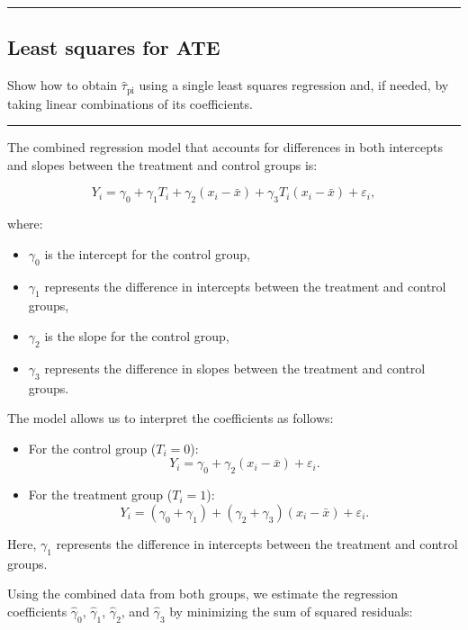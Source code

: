 \documentclass{article}
\newenvironment{colorparagraph}[1]{\par\color{#1}}{\par}
\begin{document}
\begin{colorparagraph}{questioncolor}
\rule{\textwidth}{0.5pt}

\label{q2i}\subsection{Least squares for ATE}
Show how to obtain \(\hat{\tau}_{\text{pi}}\) using a single least squares regression and, if needed, by taking linear combinations of its coefficients.

\rule{\textwidth}{0.5pt}
\end{colorparagraph}

The combined regression model that accounts for differences in both intercepts and slopes between the treatment and control groups is:

\[
Y_i = \gamma_0 + \gamma_1 T_i + \gamma_2 (x_i - \bar{x}) + \gamma_3 T_i (x_i - \bar{x}) + \varepsilon_i,
\]

where:
\begin{itemize}
    \item \(\gamma_0\) is the intercept for the control group,
    \item \(\gamma_1\) represents the difference in intercepts between the treatment and control groups,
    \item \(\gamma_2\) is the slope for the control group,
    \item \(\gamma_3\) represents the difference in slopes between the treatment and control groups.
\end{itemize}

The model allows us to interpret the coefficients as follows:

\begin{itemize}
    \item For the control group (\(T_i = 0\)): 
    \[
    Y_i = \gamma_0 + \gamma_2 (x_i - \bar{x}) + \varepsilon_i.
    \]
    \item For the treatment group (\(T_i = 1\)): 
    \[
    Y_i = (\gamma_0 + \gamma_1) + (\gamma_2 + \gamma_3)(x_i - \bar{x}) + \varepsilon_i.
    \]
\end{itemize}

Here, \(\gamma_1\) represents the difference in intercepts between the treatment and control groups.

Using the combined data from both groups, we estimate the regression coefficients \(\hat{\gamma}_0\), \(\hat{\gamma}_1\), \(\hat{\gamma}_2\), and \(\hat{\gamma}_3\) by minimizing the sum of squared residuals:
\end{document}
